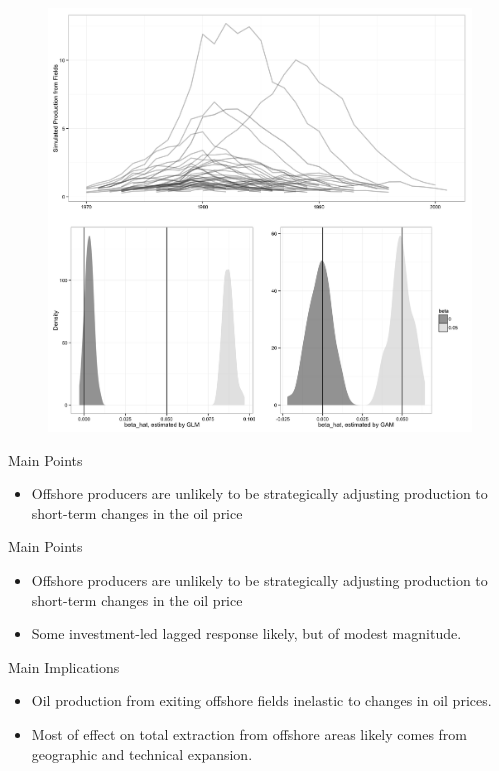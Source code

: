 \documentclass{beamer}
\begin{document}
\begin{frame}
	\begin{figure}
		\includegraphics[width=.8\textwidth]{figures/mc_plot.png}
		\label{mc_results}
	\end{figure}
\end{frame}


\begin{frame}[plain]
	Main Points
	\begin{itemize}
		\item Offshore producers are unlikely to be strategically adjusting production to short-term changes in the oil price
	\end{itemize}
\end{frame}

\begin{frame}[plain]
	Main Points
	\begin{itemize}
		\item Offshore producers are unlikely to be strategically adjusting production to short-term changes in the oil price
		\item Some investment-led lagged response likely, but of modest magnitude.
	\end{itemize}
\end{frame}

\begin{frame}[plain]
	Main Implications
	\begin{itemize}
		\item Oil production from exiting offshore fields inelastic to changes in oil prices.  
		\item Most of effect on total extraction from offshore areas likely comes from geographic and technical expansion.
	\end{itemize}
\end{frame}
\end{document}
